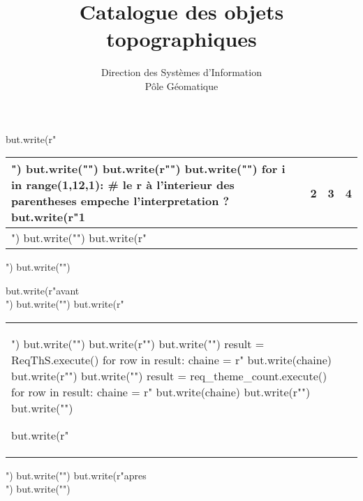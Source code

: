 \documentclass[12pt,titlepage,oneside]{book}
\author{Direction des Systèmes d'Information\\
Pôle Géomatique}
\title{Catalogue des objets topographiques}
\begin{document}
\maketitle{}
\begin{lbdpython}
but.write(r"\begin{tabular}{|m{3cm}|m{3cm}|c|m{3cm}|}")
but.write("\n")
but.write(r"\hline")
but.write("\n")
for i in range(1,12,1):
  # le r à l'interieur des parentheses empeche l'interpretation ?
  but.write(r"1 & 2 & 3 & 4 \\\hline")
  but.write("\n")
but.write(r"\end{tabular}")
but.write("\n")
\end{lbdpython}

\begin{lbdpython}
but.write(r"avant \\")
but.write("\n")
but.write(r"\begin{tabular}{|m{3cm}|m{3cm}|}")
but.write("\n")
but.write(r"\hline")
but.write("\n")
result = ReqThS.execute()
for row in result:
  chaine = r"%
  but.write(chaine)
  but.write(r"\hline")
  but.write("\n")
result = req_theme_count.execute()
for row in result:
  chaine = r"%
  but.write(chaine)
  but.write(r"\hline")
  but.write("\n")

but.write(r"\end{tabular}")
but.write("\n")
but.write(r"apres \\")
but.write("\n")
\end{lbdpython}
\end{document}

